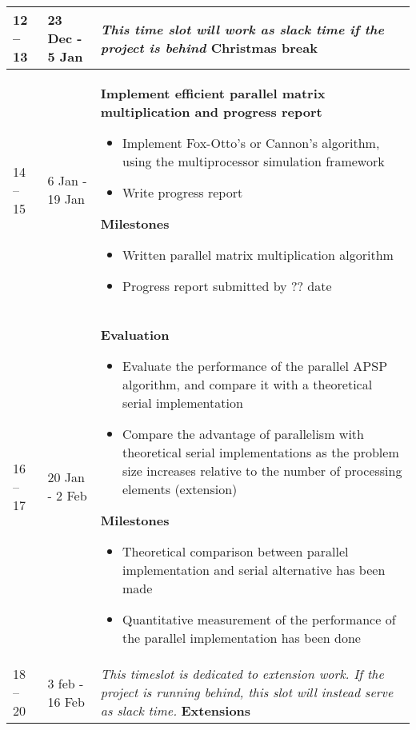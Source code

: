\documentclass{article}
\begin{document}
\begin{longtable}{m{40pt}m{75pt}m{265pt}}
    \hline
    12 -- 13 & 23 Dec - 5 Jan & %
    \textit{This time slot will work as slack time if the project is behind}
    \textbf{Christmas break} \\
    \hline
    14 -- 15 & 6 Jan - 19 Jan &
    \textbf{Implement efficient parallel matrix multiplication and progress report}
    \begin{itemize}
        \item Implement Fox-Otto's or Cannon's algorithm, using
            the multiprocessor simulation framework
        \item Write progress report
    \end{itemize}
    \textbf{Milestones}
    \begin{itemize}
        \item Written parallel matrix multiplication algorithm
        \item Progress report submitted by ?? date
    \end{itemize} \\
    \hline
    16 -- 17 & 20 Jan - 2 Feb & %
    \textbf{Evaluation}
    \begin{itemize}
        \item Evaluate the performance of the parallel APSP algorithm, and compare it with
            a theoretical serial implementation
        \item Compare the advantage of parallelism with theoretical serial implementations
            as the problem size increases relative to the number of processing
            elements (extension)
    \end{itemize}
    \textbf{Milestones}
    \begin{itemize}
        \item Theoretical comparison between parallel implementation and serial
            alternative has been made
        \item Quantitative measurement of the performance of the parallel
            implementation has been done
    \end{itemize} \\
    \hline
    18 -- 20 & 3 feb - 16 Feb & %
    
    \textit{This timeslot is dedicated to extension work. If the project is
    running behind, this slot will instead serve as slack time.}
    \textbf{Extensions}


\end{longtable}
\end{document}
